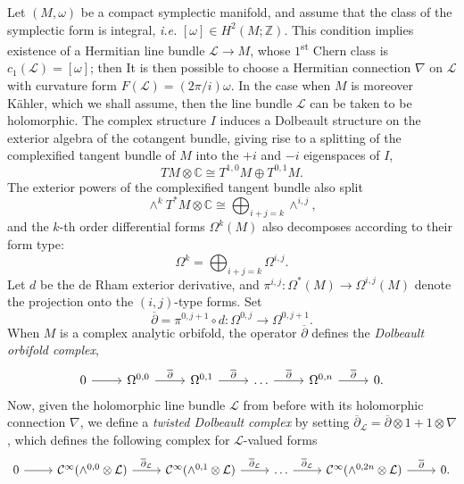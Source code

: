\documentclass{amsart}
\newcommand{\ie}{\emph{i.e.} }
\newcommand{\ra}{\rightarrow}
\newcommand{\w}{\omega}
\newcommand{\CC}{\mathbb{C}}
\newcommand{\ZZ}{\mathbb{Z}}
\newcommand{\mcC}{\mathcal{C}}
\newcommand{\mcL}{\mathcal{L}}
\newcommand{\dbar}{\overline{\partial}}
\begin{document}
	Let $(M, \w)$ be a compact symplectic manifold, and assume that the class of the symplectic form is integral, \ie $[\w] \in H^{2}(M; \ZZ)$. This condition implies existence of a Hermitian line bundle $\mcL \ra M$, whose $1$\textsuperscript{st} Chern class is $c_{1}(\mcL) = [\w]$; then It is then possible to choose a Hermitian connection $\nabla$ on $\mcL$ with curvature form $F(\mcL) = (2\pi/i)\w$. In the case when $M$ is moreover K\"ahler, which we shall assume, then the line bundle $\mcL$ can be taken to be holomorphic. The complex structure $I$ induces a Dolbeault structure on the exterior algebra of the cotangent bundle, giving rise to a splitting of the complexified tangent bundle of $M$ into the $+i$ and $-i$ eigenspaces of $I$,
    \[
        TM \otimes \CC \cong T^{1,0}M \oplus T^{0,1}M.
    \]
    The exterior powers of the complexified tangent bundle also split
    \[
        \wedge^{k}T^{\ast}M \otimes \CC \cong \bigoplus_{i + j = k} \wedge^{i,j},
    \]
    and the $k$-th order differential forms $\Omega^{k}(M)$ also decomposes according to their form type:
    \[
        \Omega^{k} = \bigoplus_{i + j = k}\Omega^{i,j}.
    \]
    Let $d$ be the de Rham exterior derivative, and $\pi^{i,j} : \Omega^{\ast}(M) \ra \Omega^{i,j}(M)$ denote the projection onto the $(i,j)$-type forms. Set
    \[
        \dbar = \pi^{0,j+1} \circ d : \Omega^{0,j} \ra \Omega^{0,j+1}.
    \]
    When $M$ is a complex analytic orbifold, the operator $\dbar$ defines the \emph{Dolbeault orbifold complex},
    \[
        \begin{tikzcd}[ampersand replacement=\&]
            0 \ar[r] \& \Omega^{0,0} \ar[r, "\dbar"] \& \Omega^{0,1} \ar[r, "\dbar"] \& \ldots \ar[r, "\dbar"] \& \Omega^{0,n} \ar[r, "\dbar"] \& 0.
        \end{tikzcd}
    \]
    Now, given the holomorphic line bundle $\mcL$ from before with its holomorphic connection $\nabla$, we define a \emph{twisted Dolbeault complex} by setting $\dbar_{\mcL} = \dbar \otimes 1 + 1 \otimes \nabla$, which defines the following complex for $\mcL$-valued forms
    \[
    \begin{tikzcd}[ampersand replacement=\&]
        0 \ar[r] \& \mcC^{\infty}(\wedge^{0,0} \otimes \mcL) \ar[r, "\dbar_{\mcL}"] \& \mcC^{\infty}(\wedge^{0,1} \otimes \mcL) \ar[r, "\dbar_{\mcL}"] \& \ldots \ar[r, "\dbar_{\mcL}"] \& \mcC^{\infty}(\wedge^{0,2n} \otimes \mcL) \ar[r, "\dbar"] \& 0.
    \end{tikzcd}
    \]
    
	
	
    
\end{document}
